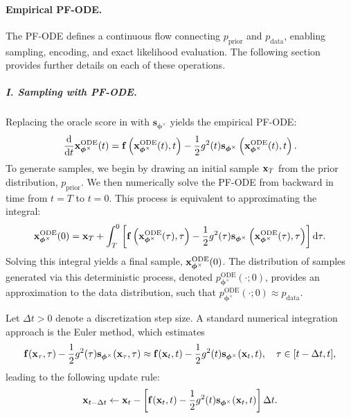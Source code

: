 \paragraph{Empirical PF-ODE.}  
The PF-ODE defines a continuous flow connecting $p_{\mathrm{prior}}$ and $p_{\mathrm{data}}$, enabling sampling, encoding, and exact likelihood evaluation. The following section provides further details on each of these operations.
\subparagraph{I. Sampling with PF-ODE.} Replacing the oracle score in  with $\mathbf{s}_{\bm{\phi}^\times}$ yields the empirical PF-ODE:
\begin{equation}\label{eq:prob_ode_sub}
    \frac{\mathop{}\!\mathrm{d}}{\mathop{}\!\mathrm{d} t} {\mathbf{x}}^{\mathrm{ODE}}_{\bm{\phi}^\times}(t) = \mathbf{f}\left({\mathbf{x}}^{\mathrm{ODE}}_{\bm{\phi}^\times}(t), t\right) - \frac{1}{2} g^2(t) \mathbf{s}_{\bm{\phi}^\times}\left({\mathbf{x}}^{\mathrm{ODE}}_{\bm{\phi}^\times}(t), t\right).
\end{equation}
To generate samples, we begin by drawing an initial sample ${\mathbf{x}}_T$ from the prior distribution, $p_{\mathrm{prior}}$. We then numerically solve the PF-ODE from  backward in time from $t=T$ to $t=0$. This process is equivalent to approximating the integral:
\[
{\mathbf{x}}^{\mathrm{ODE}}_{\bm{\phi}^\times}(0) = {\mathbf{x}}_T + \int_T^0 \left[ \mathbf{f}\left({\mathbf{x}}^{\mathrm{ODE}}_{\bm{\phi}^\times}(\tau), \tau\right) - \frac{1}{2} g^2(\tau) \mathbf{s}_{\bm{\phi}^\times}\left({\mathbf{x}}^{\mathrm{ODE}}_{\bm{\phi}^\times}(\tau), \tau\right) \right] \mathrm{d}\tau.
\]
Solving this integral yields a final sample, ${\mathbf{x}}^{\mathrm{ODE}}_{\bm{\phi}^\times}(0)$. The distribution of samples generated via this deterministic process, denoted $p_{\bm{\phi}^\times}^{\mathrm{ODE}}(\cdot; 0)$, provides an approximation to the data distribution, such that $p_{\bm{\phi}^\times}^{\mathrm{ODE}}(\cdot; 0) \approx p_{\mathrm{data}}$. 

Let $\Delta t > 0$ denote a discretization step size. A standard numerical integration approach is the Euler method, which estimates
\[
\mathbf{f}({\mathbf{x}}_\tau, \tau) - \frac{1}{2} g^2(\tau)  
\mathbf{s}_{\bm{\phi}^\times}({\mathbf{x}}_\tau, \tau) \approx \mathbf{f}({\mathbf{x}}_t, t) - \frac{1}{2} g^2(t)  
\mathbf{s}_{\bm{\phi}^\times}({\mathbf{x}}_t, t), \quad \tau \in [t-\Delta t, t],
\]
leading to the following update rule:
\begin{equation}\label{eq:euler-ode}
{\mathbf{x}}_{t - \Delta t} \leftarrow {\mathbf{x}}_t -
\left[ \mathbf{f}({\mathbf{x}}_t, t) - \frac{1}{2} g^2(t)  
\mathbf{s}_{\bm{\phi}^\times}({\mathbf{x}}_t, t) \right] \Delta t.
\end{equation}


